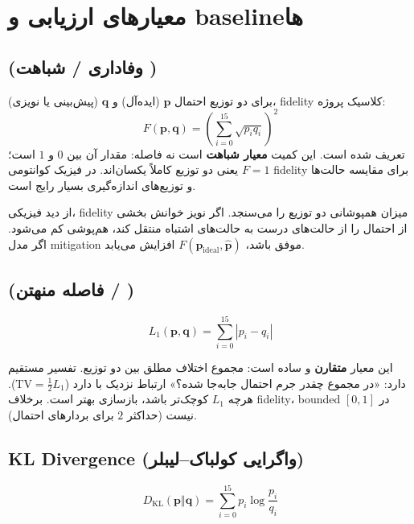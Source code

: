 \section*{معیارهای ارزیابی و baselineها}

\subsection{ (وفاداری / شباهت )}

برای دو توزیع احتمال $\mathbf{p}$ (ایده‌آل) و $\mathbf{q}$ (پیش‌بینی یا نویزی)، fidelity کلاسیک پروژه:
\begin{equation}
	F(\mathbf{p},\mathbf{q})
	=
	\left(\sum_{i=0}^{15}\sqrt{p_i q_i}\right)^2
	\label{eq:fidelity}
\end{equation}
تعریف شده است. این کمیت \textbf{معیار شباهت} است نه فاصله: مقدار آن بین $0$ و $1$ است؛ $F=1$ یعنی دو توزیع کاملاً یکسان‌اند. در فیزیک کوانتومی fidelity برای مقایسه حالت‌ها و توزیع‌های اندازه‌گیری بسیار رایج است.

از دید فیزیکی، fidelity میزان همپوشانی دو توزیع را می‌سنجد. اگر نویز خوانش بخشی از احتمال را از حالت‌های درست به حالت‌های اشتباه منتقل کند، هم‌پوشی کم می‌شود. اگر مدل mitigation موفق باشد، $F(\mathbf{p}_{\mathrm{ideal}}, \hat{\mathbf{p}})$ افزایش می‌یابد.

\subsection*{ (فاصله منهتن / )}

\begin{equation}
	L_1(\mathbf{p}, \mathbf{q}) = \sum_{i=0}^{15} |p_i - q_i|
	\label{eq:l1}
\end{equation}

این معیار \textbf{متقارن} و ساده است: مجموع اختلاف مطلق بین دو توزیع. تفسیر مستقیم دارد: «در مجموع چقدر جرم احتمال جابه‌جا شده؟» ارتباط نزدیک با  دارد ($\mathrm{TV} = \frac{1}{2}L_1$). هرچه $L_1$ کوچک‌تر باشد، بازسازی بهتر است. برخلاف fidelity، bounded در $[0,1]$ نیست (حداکثر $2$ برای بردارهای احتمال).

\subsection*{KL Divergence (واگرایی کولباک–لیبلر)}

\begin{equation}
	D_{\mathrm{KL}}(\mathbf{p} \Vert \mathbf{q})
	=
	\sum_{i=0}^{15} p_i \log\frac{p_i}{q_i}
	\label{eq:kl}
\end{equation}

